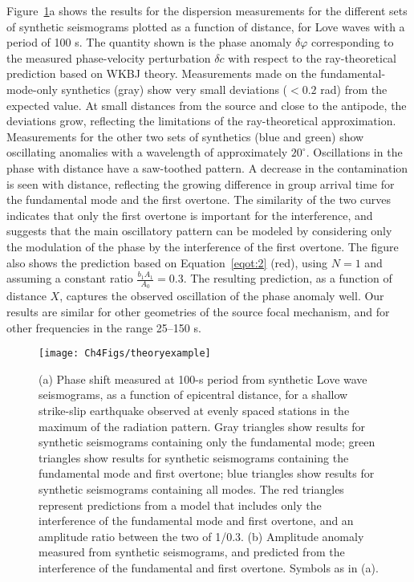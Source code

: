 \documentclass[12pt,oneside]{book}
\newcommand{\degree}[1]{\mbox{$#1^{\circ}$}}
\begin{document}
Figure~\ref{figot:theoretical}a shows the results for the dispersion measurements for the different sets of synthetic seismograms plotted as a function of distance, for Love waves with a period of 100 s. The quantity shown is the phase anomaly $\delta \varphi$ corresponding to the measured phase-velocity perturbation $\delta c$ with respect to the ray-theoretical prediction based on WKBJ theory. Measurements made on the fundamental-mode-only synthetics (gray) show very small deviations ($< 0.2$ rad) from the expected value. At small distances from the source and close to the antipode, the deviations grow, reflecting the limitations of the ray-theoretical approximation. Measurements for the other two sets of synthetics (blue and green) show oscillating anomalies with a wavelength of approximately \degree{20}. Oscillations in the phase with distance have a saw-toothed pattern. A decrease in the contamination is seen with distance, reflecting the growing difference in group arrival time for the fundamental mode and the first overtone. The similarity of the two curves indicates that only the first overtone is important for the interference, and suggests that the main oscillatory pattern can be modeled by considering only the modulation of the phase by the interference of the first overtone. The figure also shows the prediction based on Equation~\ref{eqot:2} (red), using $N = 1$ and assuming a constant ratio $\frac{b_1A_1}{A_0} = 0.3$. The resulting prediction, as a function of distance $X$, captures the observed oscillation of the phase anomaly well. Our results are similar for other geometries of the source focal mechanism, and for other frequencies in the range 25--150 s. 

\begin{figure}
\centerline{
\texttt{[image: Ch4Figs/theoryexample]}
}
\caption[Theoretical overtone interference in single-station phase and amplitude measurements]{\label{figot:theoretical}
(a) Phase shift measured at 100-s period from synthetic Love wave seismograms, as a function of epicentral distance, for a shallow strike-slip earthquake observed at evenly spaced stations in the maximum of the radiation pattern. Gray triangles show results for synthetic seismograms containing only the fundamental mode; green triangles show results for synthetic seismograms containing the fundamental mode and first overtone; blue triangles show results for synthetic seismograms containing all modes. The red triangles represent predictions from a model that includes only the interference of the fundamental mode and first overtone, and an amplitude ratio between the two of 1/0.3. (b) Amplitude anomaly measured from synthetic seismograms, and predicted from the interference of the fundamental and first overtone. Symbols as in (a).
}
\end{figure}
%
\end{document}
